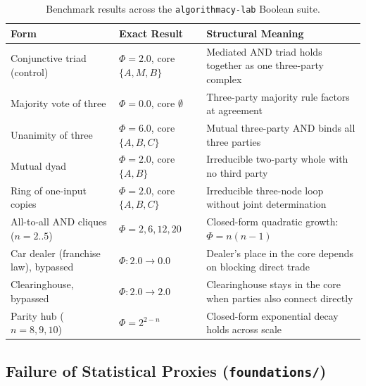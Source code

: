 \documentclass[11pt,a4paper]{article}
\begin{document}
\begin{table}[htbp]
\centering
\caption{Benchmark results across the \texttt{algorithmacy-lab} Boolean suite.}
\label{tab:landmarks}
\vspace{0.4em}
\small
\begin{tabularx}{\textwidth}{@{}l l X@{}}
\toprule
\textbf{Form} & \textbf{Exact Result} & \textbf{Structural Meaning} \\
\midrule
Conjunctive triad (control) & $\Phi = 2.0$, core $\{A, M, B\}$ & Mediated $\mathrm{AND}$ triad holds together as one three-party complex \\
Majority vote of three & $\Phi = 0.0$, core $\emptyset$ & Three-party majority rule factors at agreement \\
Unanimity of three & $\Phi = 6.0$, core $\{A, B, C\}$ & Mutual three-party $\mathrm{AND}$ binds all three parties \\
Mutual dyad & $\Phi = 2.0$, core $\{A, B\}$ & Irreducible two-party whole with no third party \\
Ring of one-input copies & $\Phi = 2.0$, core $\{A, B, C\}$ & Irreducible three-node loop without joint determination \\
All-to-all $\mathrm{AND}$ cliques ($n = 2..5$) & $\Phi = 2, 6, 12, 20$ & Closed-form quadratic growth: $\Phi = n(n - 1)$ \\
Car dealer (franchise law), bypassed & $\Phi: 2.0 \to 0.0$ & Dealer's place in the core depends on blocking direct trade \\
Clearinghouse, bypassed & $\Phi: 2.0 \to 2.0$ & Clearinghouse stays in the core when parties also connect directly \\
Parity hub ($n = 8, 9, 10$) & $\Phi = 2^{2-n}$ & Closed-form exponential decay holds across scale \\
\bottomrule
\end{tabularx}
\end{table}

\subsection{Failure of Statistical Proxies (\texttt{foundations/})}
\end{document}
